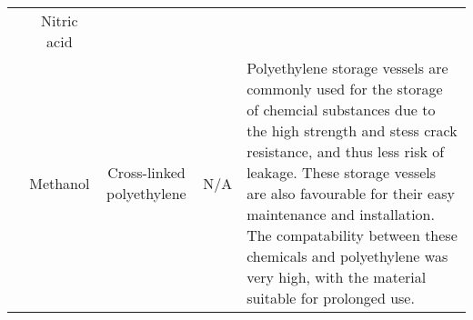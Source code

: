 \begin{table}[H]
\begin{tabular}{@{}lcccl@{}}
                                                      & \cellcolor[HTML]{FFF}Nitric acid                         &                                                                                               &                                                    &                                                                                                                                                                                                                                                                                                                                                                                                                                                                                                                                                                                                                                                                                                                                                                                                                                                                                                                                                     \\
                                                      & \cellcolor[HTML]{FFF}Methanol                            & \multirow{-5}{*}{Cross-linked polyethylene}                                                   & \multirow{-5}{*}{N/A}                              & \multirow{-5}{*}{Polyethylene   storage vessels are commonly used for the storage of chemcial substances due   to the high strength and stess crack resistance, and thus less risk of   leakage. These storage vessels are also favourable for their easy maintenance   and installation. The compatability between these chemicals and polyethylene   was very high, with the material suitable for prolonged use.}                                                                                                                                                                                                                                                                                                                                                                                                                                                                                                                                \\

\end{tabular}
\end{table}
